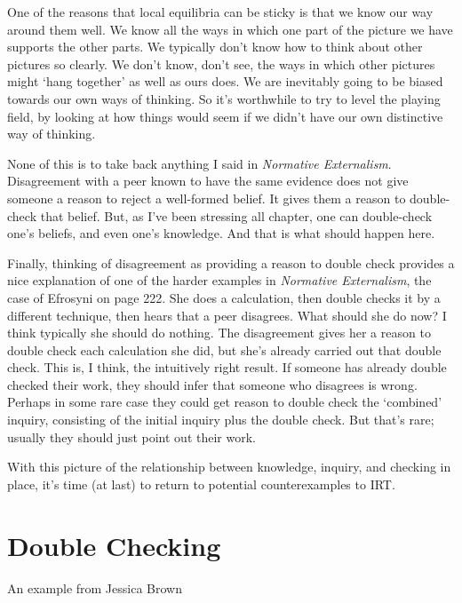 \documentclass[
  11pt,
]{book}
\begin{document}
One of the reasons that local equilibria can be sticky is that we know our way around them well. We know all the ways in which one part of the picture we have supports the other parts. We typically don't know how to think about other pictures so clearly. We don't know, don't see, the ways in which other pictures might `hang together' as well as ours does. We are inevitably going to be biased towards our own ways of thinking. So it's worthwhile to try to level the playing field, by looking at how things would seem if we didn't have our own distinctive way of thinking.

None of this is to take back anything I said in \emph{Normative Externalism}. Disagreement with a peer known to have the same evidence does not give someone a reason to reject a well-formed belief. It gives them a reason to double-check that belief. But, as I've been stressing all chapter, one can double-check one's beliefs, and even one's knowledge. And that is what should happen here.

Finally, thinking of disagreement as providing a reason to double check provides a nice explanation of one of the harder examples in \emph{Normative Externalism}, the case of Efrosyni on page 222. She does a calculation, then double checks it by a different technique, then hears that a peer disagrees. What should she do now? I think typically she should do nothing. The disagreement gives her a reason to double check each calculation she did, but she's already carried out that double check. This is, I think, the intuitively right result. If someone has already double checked their work, they should infer that someone who disagrees is wrong. Perhaps in some rare case they could get reason to double check the `combined' inquiry, consisting of the initial inquiry plus the double check. But that's rare; usually they should just point out their work.

With this picture of the relationship between knowledge, inquiry, and checking in place, it's time (at last) to return to potential counterexamples to IRT.

\hypertarget{doublecheck}{%
\section{Double Checking}\label{doublecheck}}

An example from Jessica Brown
\end{document}

